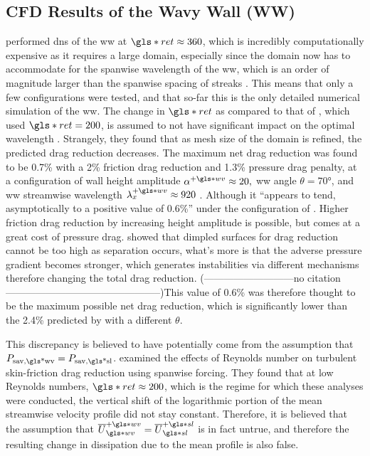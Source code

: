\subsection{CFD Results of the Wavy Wall (WW)}\label{sec:cfdww}
\textcite{ghebali2017} performed \gls{dns} of the \gls{ww} at $ \gls*{ret}\approx360$, which is incredibly computationally expensive as it requires a large domain, especially since the domain now has to accommodate for the spanwise wavelength of the \gls{ww}, which is an order of magnitude larger than the spanwise spacing of streaks \cite{chernyshenko2005}. This means that only a few configurations were tested, and that so-far this is the only detailed numerical simulation of the \gls{ww}. The change in $ \gls*{ret}$ as compared to that of \vqt, which used $ \gls*{ret}=200$, is assumed to not have significant impact on the optimal wavelength \sgc. Strangely, they found that as mesh size of the domain is refined, the predicted drag reduction decreases. The maximum net drag reduction was found to be 0.7\% with a 2\% friction drag reduction and 1.3\% pressure drag penalty, at a configuration of wall height amplitude $\alpha\pw\approx 20,$ \gls{ww} angle  $\theta=\ang{70}$, and \gls{ww} streamwise wavelength $\lambda\pw_x\approx920$ \sgc. Although it ``appears to tend, asymptotically to a positive value of 0.6\%'' under the configuration of \sgc. Higher friction drag reduction by increasing height amplitude is possible, but comes at a great cost of pressure drag. \textcite{vannesselrooij2016} showed that dimpled surfaces for drag reduction cannot be too high as separation occurs, what's more is that the adverse pressure gradient becomes stronger, which generates instabilities via different mechanisms therefore changing the total drag reduction. (---------------------------no citation-----------------------------------------------)This value of 0.6\% was therefore thought to be the maximum possible net drag reduction, which is significantly lower than the 2.4\% predicted by \textcite{chernyshenko2013} with a different $\theta$.

This discrepancy is believed to have potentially come from the assumption that $P_\text{sav,\gls*{wv}}= P _\text{sav,\gls*{sl}} $. \textcite{gatti2016} examined the effects of Reynolds number on turbulent skin-friction drag reduction using spanwise forcing. They found that at low Reynolds numbers, $\gls*{ret}\approx200$, which is the regime for which these analyses were conducted, the vertical shift of the logarithmic portion of the mean streamwise velocity profile did not stay constant. Therefore, it is believed that the assumption that $\overline{U}\pw\ww=\overline{U}\ps\ssl$ is in fact untrue, and therefore the resulting change in dissipation due to the mean profile is also false.

